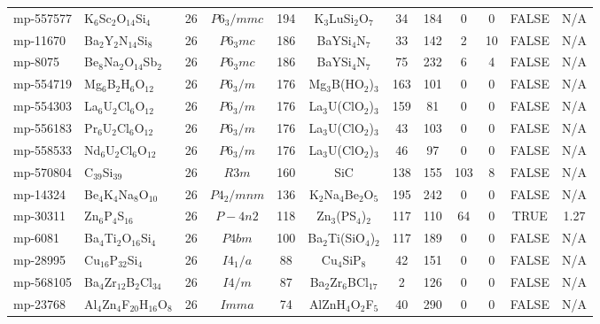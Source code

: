 {\begin{longtable}{llcccccccccc}
    mp-557577 & K$_{6}$Sc$_{2}$O$_{14}$Si$_{4}$ & 26    & $P6_3/mmc$ & 194   & K$_{3}$LuSi$_{2}$O$_{7}$ & 34    & 184   & 0     & 0     & FALSE & N/A \\
    mp-11670 & Ba$_{2}$Y$_{2}$N$_{14}$Si$_{8}$ & 26    & $P6_3mc$ & 186   & BaYSi$_{4}$N$_{7}$ & 33    & 142   & 2     & 10    & FALSE & N/A \\
    mp-8075 & Be$_{8}$Na$_{2}$O$_{14}$Sb$_{2}$ & 26    & $P6_3mc$ & 186   & BaYSi$_{4}$N$_{7}$ & 75    & 232   & 6     & 4     & FALSE & N/A \\
    mp-554719 & Mg$_{6}$B$_{2}$H$_{6}$O$_{12}$ & 26    & $P6_3/m$ & 176   & Mg$_{3}$B(HO$_{2}$)$_{3}$ & 163   & 101   & 0     & 0     & FALSE & N/A \\
    mp-554303 & La$_{6}$U$_{2}$Cl$_{6}$O$_{12}$ & 26    & $P6_3/m$ & 176   & La$_{3}$U(ClO$_{2}$)$_{3}$ & 159   & 81    & 0     & 0     & FALSE & N/A \\
    mp-556183 & Pr$_{6}$U$_{2}$Cl$_{6}$O$_{12}$ & 26    & $P6_3/m$ & 176   & La$_{3}$U(ClO$_{2}$)$_{3}$ & 43    & 103   & 0     & 0     & FALSE & N/A \\
    mp-558533 & Nd$_{6}$U$_{2}$Cl$_{6}$O$_{12}$ & 26    & $P6_3/m$ & 176   & La$_{3}$U(ClO$_{2}$)$_{3}$ & 46    & 97    & 0     & 0     & FALSE & N/A \\
    mp-570804 & C$_{39}$Si$_{39}$ & 26    & $R3m$ & 160   & SiC   & 138   & 155   & 103   & 8     & FALSE & N/A \\
    mp-14324 & Be$_{4}$K$_{4}$Na$_{8}$O$_{10}$ & 26    & $P4_2/mnm$ & 136   & K$_{2}$Na$_{4}$Be$_{2}$O$_{5}$ & 195   & 242   & 0     & 0     & FALSE & N/A \\
    mp-30311 & Zn$_{6}$P$_{4}$S$_{16}$ & 26    & $P-4n2$ & 118   & Zn$_{3}$(PS$_{4}$)$_{2}$ & 117   & 110   & 64    & 0     & TRUE  & 1.27  \\
    mp-6081 & Ba$_{4}$Ti$_{2}$O$_{16}$Si$_{4}$ & 26    & $P4bm$ & 100   & Ba$_{2}$Ti(SiO$_{4}$)$_{2}$ & 117   & 189   & 0     & 0     & FALSE & N/A \\
    mp-28995 & Cu$_{16}$P$_{32}$Si$_{4}$ & 26    & $I4_1/a$ & 88    & Cu$_{4}$SiP$_{8}$ & 42    & 151   & 0     & 0     & FALSE & N/A \\
    mp-568105 & Ba$_{4}$Zr$_{12}$B$_{2}$Cl$_{34}$ & 26    & $I4/m$ & 87    & Ba$_{2}$Zr$_{6}$BCl$_{17}$ & 2     & 126   & 0     & 0     & FALSE & N/A \\
    mp-23768 & Al$_{4}$Zn$_{4}$F$_{20}$H$_{16}$O$_{8}$ & 26    & $Imma$ & 74    & AlZnH$_{4}$O$_{2}$F$_{5}$ & 40    & 290   & 0     & 0     & FALSE & N/A \\

\end{longtable}}
